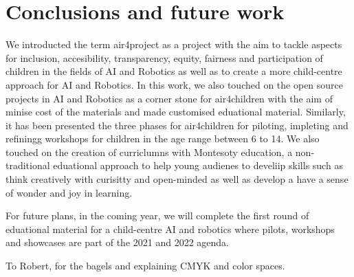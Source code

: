 \documentclass[sigconf]{acmart}
\begin{document}
\section{Conclusions and future work}
We introducted the term air4project as a project with the aim to tackle aspects for inclusion, accesibility, transparency, equity, fairness and participation of children in the fields of AI and Robotics as well as to create a more child-centre approach for AI and Robotics.
In this work, we also touched on the open source projects in AI and Robotics as a corner stone for air4children with the aim of minise cost of the materials and made customised eduational material.  
Similarly, it has been presented the three phases for air4children for piloting, impleting and refiningg workshops for children in the age range between 6 to 14. 
We also touched on the creation of curriclumns with Montesoty education, a non-traditional eduational approach to help young audienes to develiip skills such as think creatively with curisitty and open-minded as well as develop a have a sense of wonder and joy in learning.

For future plans, in the coming year, we will complete the first round of eduational material for a child-centre AI and robotics where pilots, workshops and showcases are part of the 2021 and 2022 agenda.  


\begin{acks}
To Robert, for the bagels and explaining CMYK and color spaces.
\end{acks}



\end{document}
